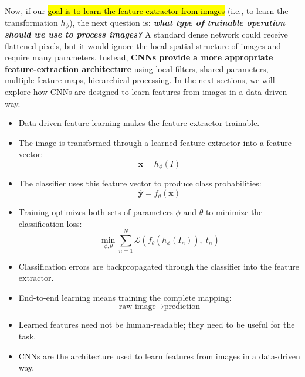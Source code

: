 \highspace
Now, if our \hl{goal is to learn the feature extractor from images} (i.e., to learn the transformation $h_{\phi}$), the next question is: \textbf{\emph{what type of trainable operation should we use to process images?}} A standard dense network could receive flattened pixels, but it would ignore the local spatial structure of images and require many parameters. Instead, \textbf{CNNs provide a more appropriate feature-extraction architecture} using local filters, shared parameters, multiple feature maps, hierarchical processing. In the next sections, we will explore how CNNs are designed to learn features from images in a data-driven way.

\highspace
\begin{takeawaysbox}
    \begin{itemize}
        \item Data-driven feature learning makes the feature extractor trainable.
        \item The image is transformed through a learned feature extractor into a feature vector:
        \begin{equation*}
            \mathbf{x} = h_{\phi}(I)
        \end{equation*}
        \item The classifier uses this feature vector to produce class probabilities:
        \begin{equation*}
            \hat{\mathbf{y}} = f_{\theta}\left(\mathbf{x}\right)
        \end{equation*}
        \item Training optimizes both sets of parameters $\phi$ and $\theta$ to minimize the classification loss:
        \begin{equation*}
            \displaystyle\min_{\phi,\theta}\sum_{n=1}^{N} \mathcal{L}\left(
                f_{\theta}\left(h_{\phi}\left(I_{n}\right)\right), \; t_{n}
            \right)
        \end{equation*}
        \item Classification errors are backpropagated through the classifier into the feature extractor.
        \item End-to-end learning means training the complete mapping:
        \begin{equation*}
            \text{raw image} \to \text{prediction}
        \end{equation*}
        \item Learned features need not be human-readable; they need to be useful for the task.
        \item CNNs are the architecture used to learn features from images in a data-driven way.
    \end{itemize}
\end{takeawaysbox}